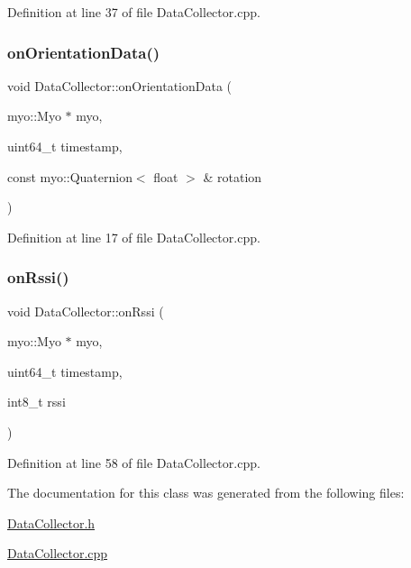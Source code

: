 Definition at line 37 of file Data\+Collector.\+cpp.

\mbox{\label{class_data_collector_a7e54df882eed064e4059b3361dff796f}} 
\subsubsection{\texorpdfstring{on\+Orientation\+Data()}{onOrientationData()}}
{\footnotesize\ttfamily void Data\+Collector\+::on\+Orientation\+Data (\begin{DoxyParamCaption}\item[{myo\+::\+Myo $\ast$}]{myo,  }\item[{uint64\+\_\+t}]{timestamp,  }\item[{const myo\+::\+Quaternion$<$ float $>$ \&}]{rotation }\end{DoxyParamCaption})}



Definition at line 17 of file Data\+Collector.\+cpp.

\mbox{\label{class_data_collector_aff0d95e10b014c460bf859abd6a01f74}} 
\subsubsection{\texorpdfstring{on\+Rssi()}{onRssi()}}
{\footnotesize\ttfamily void Data\+Collector\+::on\+Rssi (\begin{DoxyParamCaption}\item[{myo\+::\+Myo $\ast$}]{myo,  }\item[{uint64\+\_\+t}]{timestamp,  }\item[{int8\+\_\+t}]{rssi }\end{DoxyParamCaption})}



Definition at line 58 of file Data\+Collector.\+cpp.



The documentation for this class was generated from the following files\+:\begin{DoxyCompactItemize}
\item 
\mbox{\hyperlink{_data_collector_8h}{Data\+Collector.\+h}}\item 
\mbox{\hyperlink{_data_collector_8cpp}{Data\+Collector.\+cpp}}\end{DoxyCompactItemize}
